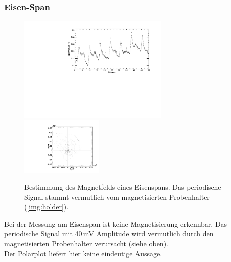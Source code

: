 \subsubsection{Eisen-Span}
\begin{figure}[H]
\begin{center}
  \includegraphics[width=0.64\textwidth]{../img/Fe-Span.pdf}
  \includegraphics[width=0.35\textwidth]{../img/polar_Fe-Span.pdf}
  \caption{Bestimmung des Magnetfelds eines Eisenspans. Das periodische Signal stammt vermutlich
  vom magnetisierten Probenhalter (\autoref{img:holder}).}
  \label{img:fespan}
\end{center}
\end{figure}
Bei der Messung am Eisenspan ist keine Magnetisierung erkennbar.
Das periodische Signal mit 40\,mV Amplitude wird vermutlich durch den magnetisierten Probenhalter
verursacht (siehe oben).\\
Der Polarplot liefert hier keine eindeutige Aussage.


